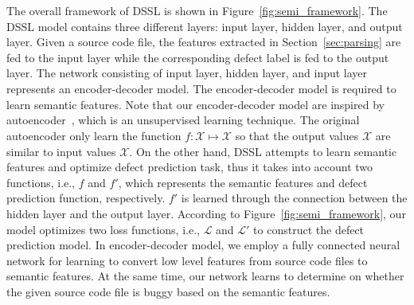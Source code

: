 The overall framework of DSSL is shown in Figure~\ref{fig:semi_framework}. The DSSL model contains three different layers: input layer, hidden layer, and output layer. Given a source code file, the features extracted in Section~\ref{sec:parsing} are fed to the input layer while the corresponding defect label is fed to the output layer. The network consisting of input layer, hidden layer, and input layer represents an encoder-decoder model. The encoder-decoder model is required to learn semantic features. Note that our encoder-decoder model are inspired by autoencoder~\cite{ng2011sparse}, which is an unsupervised learning technique. The original autoencoder only learn the function $f: \mathcal{X} \longmapsto \mathcal{X}$ so that the output values $\mathcal{\hat{X}}$ are similar to input values $\mathcal{X}$. On the other hand, DSSL attempts to learn semantic features and optimize defect prediction task, thus it takes into account two functions, i.e., $f$ and $f'$, which represents the semantic features and defect prediction function, respectively. $f'$ is learned through the connection between the hidden layer and the output layer. According to Figure~\ref{fig:semi_framework}, our model optimizes two loss functions, i.e., $\mathcal{L}$ and $\mathcal{L'}$ to construct the defect prediction model. In encoder-decoder model, we employ a fully connected neural network for learning to convert low level features from source code files to semantic features. At the same time, our network learns to determine on whether the given source code file is buggy based on the semantic features. 


